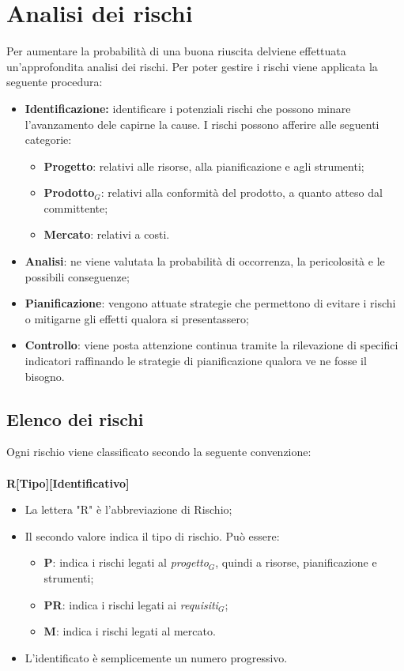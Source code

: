\chapter{Analisi dei rischi}\label{AnRischi}
Per aumentare la probabilità di una buona riuscita delviene effettuata un'approfondita analisi dei rischi. Per poter gestire i rischi viene applicata la seguente procedura:
\begin{itemize}
	\item \textbf{Identificazione:} identificare i potenziali rischi che possono minare l'avanzamento dele capirne la cause. I rischi possono afferire alle seguenti categorie:
	\begin{itemize}
		\item \textbf{Progetto}: relativi alle risorse, alla pianificazione e agli strumenti;
		\item \textbf{Prodotto$_{G}$}: relativi alla conformità del prodotto, a quanto atteso dal committente;
		\item \textbf{Mercato}: relativi a costi.
	\end{itemize}
	\item \textbf{Analisi}: ne viene valutata la probabilità di occorrenza, la pericolosità e le possibili conseguenze;
	\item \textbf{Pianificazione}: vengono attuate strategie che permettono di evitare i rischi o mitigarne gli effetti qualora si presentassero;
	\item \textbf{Controllo}: viene posta attenzione continua tramite la rilevazione di specifici indicatori raffinando le strategie di pianificazione qualora ve ne fosse il bisogno.
\end{itemize}
\section{Elenco dei rischi}
Ogni rischio viene classificato secondo la seguente convenzione:\\\\
\centering \textbf{R[Tipo][Identificativo]}\\
\begin{itemize}
	\item La lettera "R" è l'abbreviazione di Rischio;
	\item Il secondo valore indica il tipo di rischio. Può essere:
	\begin{itemize}
		\item \textbf{P}: indica i rischi legati al \textit{progetto$_{G}$}, quindi a risorse, pianificazione e strumenti;
		\item \textbf{PR}: indica i rischi legati ai \textit{requisiti$_{G}$};
		\item \textbf{M}: indica i rischi legati al mercato.
	\end{itemize}
	\item L'identificato è semplicemente un numero progressivo.
\end{itemize}

